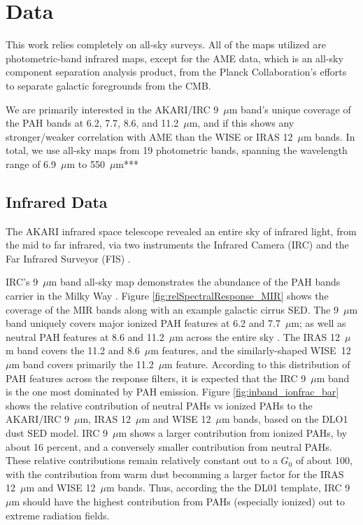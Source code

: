 \documentclass[preprint2,longabstract]{aastex}
\begin{document}
\section{Data}
\label{sec:data}

This work relies completely on all-sky surveys. All of the maps utilized are photometric-band infrared maps, except for the AME data, which is an all-sky component separation analysis product, from the Planck Collaboration's efforts to separate galactic foregrounds from the CMB.

We are primarily interested in the AKARI/IRC 9~$\mu$m band's unique coverage of the PAH bands at 6.2, 7.7, 8.6, and 11.2~$\mu$m, and if this shows any stronger/weaker correlation with AME than the WISE or IRAS 12~$\mu$m bands. In total, we use all-sky maps from 19 photometric bands, spanning the wavelength range of 6.9~$\mu$m to 550~$\mu$m***

\subsection{Infrared Data}

     The AKARI infrared space telescope revealed an entire sky of infrared light, from the mid to far infrared, via two instruments \citep{akari07} the Infrared Camera (IRC)\citep{irc07} and the Far Infrared Surveyor (FIS) \citep{fis07}.

     IRC's 9~$\mu$m band all-sky map demonstrates the abundance of the PAH bands carrier in the Milky Way \citep{ishihara10}. Figure \ref{fig:relSpectralResponse_MIR} shows the coverage of the MIR bands along with an example galactic cirrus SED. The 9~$\mu$m band uniquely covers major ionized PAH features at 6.2 and 7.7~$\mu$m; as well as neutral PAH features at 8.6 and 11.2~$\mu$m across the entire sky \citep{irc07}. The IRAS 12~$\mu$m band covers the 11.2 and 8.6~$\mu$m features, and the similarly-shaped WISE~12~$\mu$m band covers primarily the 11.2~$\mu$m feature. According to this distribution of PAH features across the response filters, it is expected that the IRC 9~$\mu$m band is the one most dominated by PAH emission. Figure \ref{fig:inband_ionfrac_bar} shows the relative contribution of neutral PAHs vs ionized PAHs to the AKARI/IRC 9~$\mu$m, IRAS 12~$\mu$m and WISE 12~$\mu$m bands, based on the DLO1 dust SED model. IRC 9~$\mu$m shows a larger contribution from ionized PAHs, by about 16 percent, and a conversely smaller contribution from neutral PAHs. These relative contributions remain relatively constant out to a $G_{0}$ of about 100, with the contribution from warm dust becomming a larger factor for the IRAS 12~$\mu$m and WISE 12~$\mu$m bands. Thus, according the the DL01 template, IRC 9~$\mu$m should have the highest contribution from PAHs (especially ionized) out to extreme radiation fields.
\end{document}
